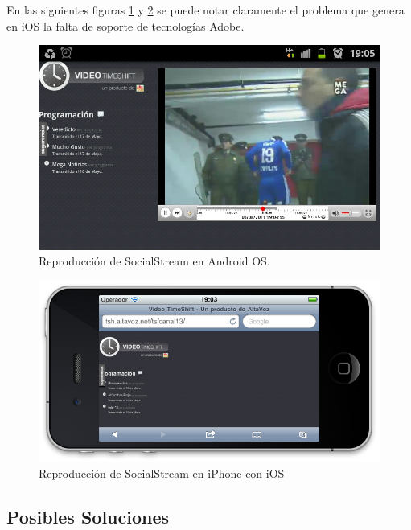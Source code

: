 	En las siguientes figuras \ref{sshot_Android_sstream} y \ref{sshot_iOS_sstream} se puede notar claramente el problema que genera en iOS la falta de soporte de tecnologías Adobe.

\begin{figure}[h!]
	\centering
	 \includegraphics[scale=0.47]{imgs/sshot_Android_sstream.jpg}
 	\caption{Reproducción de SocialStream en Android OS.}
	\label{sshot_Android_sstream}
\end{figure}
\begin{figure}[h!]
	\centering
	\includegraphics[scale=0.55]{imgs/sshot_iOS_sstream.png}
	\caption{Reproducción de SocialStream en iPhone con iOS}
	\label{sshot_iOS_sstream}
\end{figure}

\newpage
\subsection{Posibles Soluciones}

